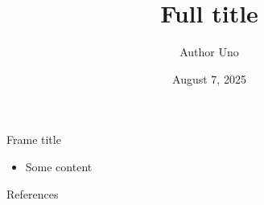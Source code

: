 \documentclass{beamer}
\title[Short tile]{Full title}
\author[short authors]
{
    Author Uno\inst{1}
}
\institute[] %
{
    \inst{1}%
    Some institute
}
\date{August 7, 2025}
\begin{document}
\frame{\titlepage}

\begin{frame}{Frame title}
    \begin{itemize}
        \item Some content \cite{DBLP:conf/eurocrypt/Grieu00}
    \end{itemize}
\end{frame}

\begin{frame}[allowframebreaks]{References}
    
    
\end{frame}
\end{document}
